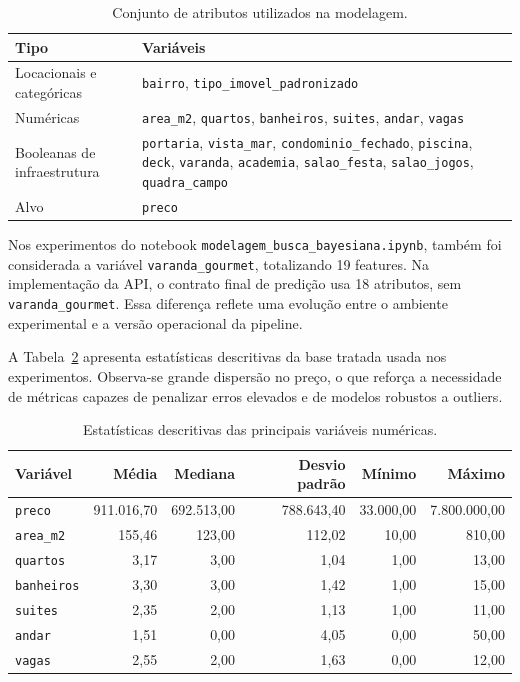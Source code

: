 \documentclass[12pt,a4paper]{article}
\begin{document}
\begin{table}[H]
\centering
\caption{Conjunto de atributos utilizados na modelagem.}
\label{tab:features}
\begin{tabular}{p{4cm} p{10cm}}
\toprule
Tipo & Variáveis \\
\midrule
Locacionais e categóricas & \texttt{bairro}, \texttt{tipo\_imovel\_padronizado} \\
Numéricas & \texttt{area\_m2}, \texttt{quartos}, \texttt{banheiros}, \texttt{suites}, \texttt{andar}, \texttt{vagas} \\
Booleanas de infraestrutura & \texttt{portaria}, \texttt{vista\_mar}, \texttt{condominio\_fechado}, \texttt{piscina}, \texttt{deck}, \texttt{varanda}, \texttt{academia}, \texttt{salao\_festa}, \texttt{salao\_jogos}, \texttt{quadra\_campo} \\
Alvo & \texttt{preco} \\
\bottomrule
\end{tabular}
\end{table}

Nos experimentos do notebook \texttt{modelagem\_busca\_bayesiana.ipynb}, também foi considerada a variável \texttt{varanda\_gourmet}, totalizando 19 features. Na implementação da API, o contrato final de predição usa 18 atributos, sem \texttt{varanda\_gourmet}. Essa diferença reflete uma evolução entre o ambiente experimental e a versão operacional da pipeline.

A Tabela~\ref{tab:estatisticas} apresenta estatísticas descritivas da base tratada usada nos experimentos. Observa-se grande dispersão no preço, o que reforça a necessidade de métricas capazes de penalizar erros elevados e de modelos robustos a outliers.

\begin{table}[H]
\centering
\caption{Estatísticas descritivas das principais variáveis numéricas.}
\label{tab:estatisticas}
\begin{tabular}{lrrrrr}
\toprule
Variável & Média & Mediana & Desvio padrão & Mínimo & Máximo \\
\midrule
\texttt{preco} & 911.016,70 & 692.513,00 & 788.643,40 & 33.000,00 & 7.800.000,00 \\
\texttt{area\_m2} & 155,46 & 123,00 & 112,02 & 10,00 & 810,00 \\
\texttt{quartos} & 3,17 & 3,00 & 1,04 & 1,00 & 13,00 \\
\texttt{banheiros} & 3,30 & 3,00 & 1,42 & 1,00 & 15,00 \\
\texttt{suites} & 2,35 & 2,00 & 1,13 & 1,00 & 11,00 \\
\texttt{andar} & 1,51 & 0,00 & 4,05 & 0,00 & 50,00 \\
\texttt{vagas} & 2,55 & 2,00 & 1,63 & 0,00 & 12,00 \\
\bottomrule
\end{tabular}
\end{table}
\end{document}

